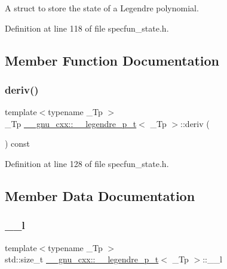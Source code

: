 A struct to store the state of a Legendre polynomial. 

Definition at line 118 of file specfun\+\_\+state.\+h.



\subsection{Member Function Documentation}
\mbox{\label{struct____gnu__cxx_1_1____legendre__p__t_a91e1b4e4049e5085b52342db2afbad9d}} 
\subsubsection{\texorpdfstring{deriv()}{deriv()}}
{\footnotesize\ttfamily template$<$typename \+\_\+\+Tp $>$ \\
\+\_\+\+Tp \hyperlink{struct____gnu__cxx_1_1____legendre__p__t}{\+\_\+\+\_\+gnu\+\_\+cxx\+::\+\_\+\+\_\+legendre\+\_\+p\+\_\+t}$<$ \+\_\+\+Tp $>$\+::deriv (\begin{DoxyParamCaption}{ }\end{DoxyParamCaption}) const\hspace{0.3cm}{\ttfamily [inline]}}



Definition at line 128 of file specfun\+\_\+state.\+h.



\subsection{Member Data Documentation}
\mbox{\label{struct____gnu__cxx_1_1____legendre__p__t_a1dc68f604d546cb75e4009a7da9cc152}} 
\subsubsection{\texorpdfstring{\+\_\+\+\_\+l}{\_\_l}}
{\footnotesize\ttfamily template$<$typename \+\_\+\+Tp $>$ \\
std\+::size\+\_\+t \hyperlink{struct____gnu__cxx_1_1____legendre__p__t}{\+\_\+\+\_\+gnu\+\_\+cxx\+::\+\_\+\+\_\+legendre\+\_\+p\+\_\+t}$<$ \+\_\+\+Tp $>$\+::\+\_\+\+\_\+l}



